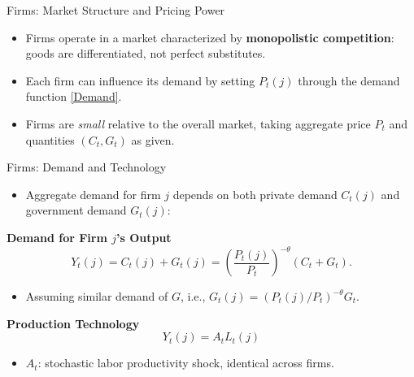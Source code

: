 \documentclass[11pt,aspectratio=169]{beamer}
\begin{document}
\begin{frame}[label=FirmMarket]{Firms: Market Structure and Pricing Power}
\small

\begin{itemize}
  \item Firms operate in a market characterized by \textbf{monopolistic competition}: goods are differentiated, not perfect substitutes.
  \vspace{0.5em}
  \item Each firm can influence its demand by setting $P_t(j)$ through the demand function \eqref{Demand}.
\vspace{0.5em}
\item Firms are \emph{small} relative to the overall market, taking aggregate price $P_t$ and quantities $(C_t, G_t)$ as given.
\end{itemize}

\end{frame}
\begin{frame}[label=Firms]{Firms: Demand and Technology}
\small
\begin{itemize}
    \item Aggregate demand for firm $j$ depends on both private demand $C_t(j)$ and government demand $G_t(j)$:
\end{itemize}
\textbf{Demand for Firm $j$'s Output}
\begin{equation}
Y_t(j) = C_t(j) + G_t(j) = \left(\frac{P_t(j)}{P_t}\right)^{-\theta} (C_t + G_t).
\label{Demand}
\end{equation}

\begin{itemize}
  \item Assuming similar demand of $G$, i.e., $G_t(j) = \left(P_t(j)/P_t\right)^{-\theta} G_t$.
\end{itemize}

\vspace{0.3cm}
\textbf{Production Technology}
\begin{equation}
Y_t(j) = A_t L_t(j)
\end{equation}

\begin{itemize}
  \item $A_t$: stochastic labor productivity shock, identical across firms.
\end{itemize}

\end{frame}
\end{document}
